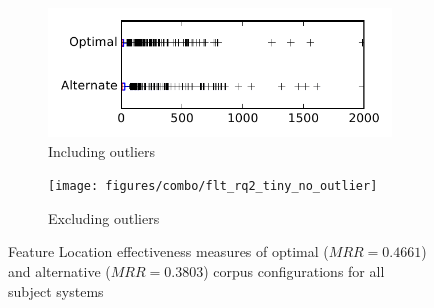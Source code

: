 
\begin{figure}
    \centering
    \begin{subfigure}{.4\textwidth}
        \centering
        \includegraphics[height=0.4\textheight]{figures/combo/flt_rq2_tiny}
        \caption{Including outliers}\label{fig:combo:flt:rq2:tiny_outlier}
    \end{subfigure}%
    \begin{subfigure}{.4\textwidth}
        \centering
        \texttt{[image: figures/combo/flt\_rq2\_tiny\_no\_outlier]}
        \caption{Excluding outliers}\label{fig:combo:flt:rq2:tiny_no_outlier}
    \end{subfigure}
\caption{Feature Location effectiveness measures of optimal ($MRR=0.4661$) and alternative ($MRR=0.3803$) corpus configurations for all subject systems}
\label{fig:combo:flt:rq2:tiny}
\end{figure}
